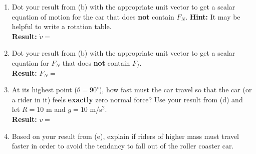 \begin{enumerate}
\clearpage
\item Dot your result from (b) with the appropriate unit vector to get a scalar equation of motion for the car that does \textbf{not} contain $F_N$. \textbf{Hint:} It may be helpful to write a rotation table.
\\[1.0pc]\textbf{Result:} \hspace{1in}  $\dot{v} = $
      \vspace{2.1in}

\item Dot your result from (b) with the appropriate unit vector to get a scalar equation for $F_N$ that does \textbf{not} contain $F_f$.
\\[1.0pc]\textbf{Result:} \hspace{1in}  $F_N = $
      \vspace{2.1in}

\item At its highest point ($\theta = 90^\circ$), how fast must the car travel so that the car (or a rider in it) feels \textbf{exactly} zero normal force?  Use your result from (d) and let $R = 10$ m and $g = 10$ m/s$^2$.
\\[1.0pc]\textbf{Result:} \hspace{1in}  $v = $
      \vspace{2.0in}

\item Based on your result from (e), explain if riders of higher mass must travel faster in order to avoid the tendancy to fall out of the roller coaster car.

\end{enumerate}
%
